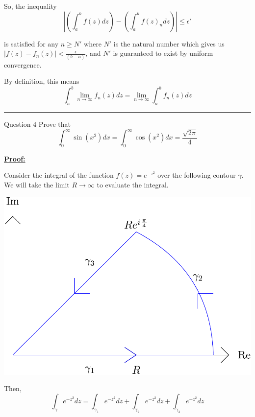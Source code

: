 \documentclass{article}
\begin{document}
So, the inequality
\[ \left| \left(\int_{a}^{b} f(z) dz\right) - \left(\int_a^b f(z)_n dz\right) \right| \leq \epsilon' \]

is satisfied for any $n \geq N'$ where $N'$ is the natural number which gives us $\left|f(z) - f_n(z)\right| < \frac{\epsilon}{(b-a)}$, and $N'$ is guaranteed to exist by uniform convergence. 

\vskip 0.5cm
By definition, this means
\[ \int_{a}^{b} \lim_{n \rightarrow \infty}  f_n(z) dz = \lim_{n \rightarrow \infty} \int_{a}^{b} f_n(z) dz  \]

\vskip 0.5cm
\hrule 
\vskip 0.5cm


\begin{mathdefinitionbox}{Question 4}
\vskip 0.5cm
Prove that 
\[ \int_{0}^{\infty} \sin\left( x^2 \right) dx = \int_{0}^{\infty} \cos\left( x^2 \right) dx = \frac{\sqrt{2\pi}}{4} \]
\end{mathdefinitionbox}

\vskip 0.5cm
\underline{\textbf{Proof:}}

Consider the integral of the function $f(z) = e^{-z^2}$ over the following contour $\gamma$. We will take the limit $R \rightarrow \infty$ to evaluate the integral.

\vskip 0.5cm
\begin{center}
  \includegraphics*[scale=0.20]{Q4 HW 4.png}
\end{center}

Then, 
\[ \int_{\gamma} e^{-z^2} dz = \int_{{\gamma_1}} e^{-z^2} dz + \int_{{\gamma_2}} e^{-z^2} dz + \int_{{\gamma_3}} e^{-z^2} dz \]
\end{document}
